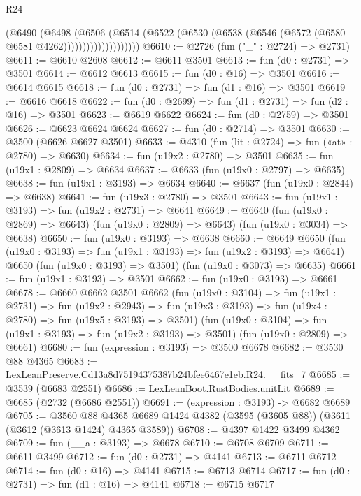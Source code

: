 \begin{lexlean}{R24}
\begin{coremodule}
                        (@6490
                          (@6498
                            (@6506
                              (@6514
                                (@6522
                                  (@6530 (@6538 (@6546 (@6572 (@6580 @6581 @4262))))))))))))))))))))
@6610 := @2726 (fun ("_" : @2724) => @2731)
@6611 := @6610 @2608
@6612 := @6611 @3501
@6613 := fun (d0 : @2731) => @3501
@6614 := @6612 @6613
@6615 := fun (d0 : @16) => @3501
@6616 := @6614 @6615
@6618 := fun (d0 : @2731) => fun (d1 : @16) => @3501
@6619 := @6616 @6618
@6622 := fun (d0 : @2699) => fun (d1 : @2731) => fun (d2 : @16) => @3501
@6623 := @6619 @6622
@6624 := fun (d0 : @2759) => @3501
@6626 := @6623 @6624 @6624
@6627 := fun (d0 : @2714) => @3501
@6630 := @3500 (@6626 @6627 @3501)
@6633 := @4310 (fun (lit : @2724) => fun («at» : @2780) => @6630)
@6634 := fun (u19x2 : @2780) => @3501
@6635 := fun (u19x1 : @2809) => @6634
@6637 := @6633 (fun (u19x0 : @2797) => @6635)
@6638 := fun (u19x1 : @3193) => @6634
@6640 := @6637 (fun (u19x0 : @2844) => @6638)
@6641 := fun (u19x3 : @2780) => @3501
@6643 := fun (u19x1 : @3193) => fun (u19x2 : @2731) => @6641
@6649 := @6640
    (fun (u19x0 : @2869) => @6643)
    (fun (u19x0 : @2809) => @6643)
    (fun (u19x0 : @3034) => @6638)
@6650 := fun (u19x0 : @3193) => @6638
@6660 := @6649
    @6650
    (fun (u19x0 : @3193) => fun (u19x1 : @3193) => fun (u19x2 : @3193) => @6641)
    @6650
    (fun (u19x0 : @3193) => @3501)
    (fun (u19x0 : @3073) => @6635)
@6661 := fun (u19x1 : @3193) => @3501
@6662 := fun (u19x0 : @3193) => @6661
@6678 := @6660
    @6662
    @3501
    @6662
    (fun (u19x0 : @3104) =>
    fun (u19x1 : @2731) =>
    fun (u19x2 : @2943) =>
    fun (u19x3 : @3193) => fun (u19x4 : @2780) => fun (u19x5 : @3193) => @3501)
    (fun (u19x0 : @3104) => fun (u19x1 : @3193) => fun (u19x2 : @3193) => @3501)
    (fun (u19x0 : @2809) => @6661)
@6680 := fun (expression : @3193) => @3500 @6678
@6682 := @3530 @88 @4365
@6683 := LexLeanPreserve.Cd13a8d75194375387b24bfee6467e1eb.R24.__fits_7
@6685 := @3539 (@6683 @2551)
@6686 := LexLeanBoot.RustBodies.unitLit
@6689 := @6685 (@2732 (@6686 @2551))
@6691 := (expression : @3193) -> @6682 @6689
@6705 := @3560
    @88
    @4365
    @6689
    @1424
    @4382
    (@3595 (@3605 @88))
    (@3611 (@3612 (@3613 @1424) @4365 @3589))
@6708 := @4397 @1422 @3499 @4362
@6709 := fun (__a : @3193) => @6678
@6710 := @6708 @6709
@6711 := @6611 @3499
@6712 := fun (d0 : @2731) => @4141
@6713 := @6711 @6712
@6714 := fun (d0 : @16) => @4141
@6715 := @6713 @6714
@6717 := fun (d0 : @2731) => fun (d1 : @16) => @4141
@6718 := @6715 @6717

\end{coremodule}
\end{lexlean}
